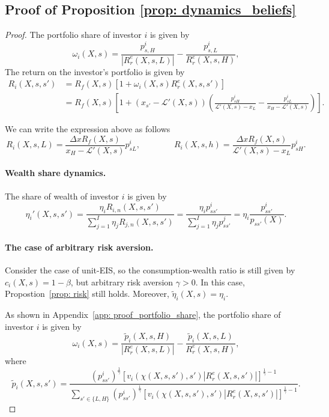 \subsection{Proof of Proposition \ref{prop: dynamics_beliefs}}\label{app: proof_dynamics_beliefs}

\begin{proof} The portfolio share of investor $i$ is given by
    \begin{equation}
        \omega_i(X,s) = \frac{p_{s,H}^i}{|R_r^e(X,s,L)|}  -\frac{p_{s,L}^i}{R_r^e(X,s,H)},
    \end{equation}
    The return on the investor's portfolio is given by
    \begin{align}
        R_{i}(X,s,s') &= R_f(X,s) \left[ 1 + \omega_i(X,s) R_r^e(X,s,s') \right] \\
        &= R_f(X,s) \left[1 + (x_{s'} - \mathcal{L}'(X,s)) \left( \frac{p_{sH}^i}{\mathcal{L}'(X,s)-x_L}  -\frac{p_{sL}^i}{x_H-\mathcal{L}'(X,s)} \right) \right].
    \end{align}
    
We can write the expression above as follows 
\begin{equation}
    R_i(X,s,L) = \frac{\Delta x R_f(X,s)}{x_H - \mathcal{L}'(X,s)} p_{sL}^i, \qquad  \qquad 
    R_i(X,s,h) = \frac{\Delta x R_f(X,s)}{\mathcal{L}'(X,s) - x_L} p_{sH}^i.
\end{equation}

\paragraph{Wealth share dynamics.} The share of wealth of investor $i$ is given by
\begin{equation}
    \eta_i'(X,s,s') = \frac{\eta_i R_{i,n}(X,s,s')}{\sum_{j=1}^I\eta_j R_{j,n}(X,s,s')} = \frac{\eta_i p_{ss'}^i}{\sum_{j=1}^I \eta_j p_{ss'}^j} = \eta_i \frac{p^i_{ss'}}{p_{ss'}(X)}.
\end{equation}

\paragraph{The case of arbitrary risk aversion.} Consider the case of unit-EIS, so the consumption-wealth ratio is still given by $c_i(X,s) = 1-\beta$, but arbitrary risk aversion $\gamma > 0$. 
In this case, Propostion~\ref{prop: risk} still holds. 
Moreover, $\tilde{\eta}_i(X,s) = \eta_i$. 

As shown in Appendix~\ref{app: proof_portfolio_share}, the portfolio share of investor $i$ is given by
\begin{equation}
    \omega_{i}(X,s) =  \frac{\tilde{p}_i(X,s,H)}{|R_r^e(X,s,L)|} -  \frac{\tilde{p}_i(X,s,L)}{R_r^e(X,s,H)}, 
    \end{equation}
    where
    \begin{equation}
        \tilde{p}_{i}(X,s,s') = \frac{(p_{ss'}^i)^{\frac{1}{\gamma}} \left[ v_{i}(\chi(X,s,s'),s') |R_r^e(X,s,s')| \right]^{\frac{1}{\gamma}-1}}{\sum_{s'\in \{L,H\} } (p_{ss'}^i)^{\frac{1}{\gamma}} \left[ v_{i}(\chi(X,s,s'),s') |R_r^e(X,s,s')| \right]^{\frac{1}{\gamma}-1} }.
    \end{equation}    


\end{proof}
